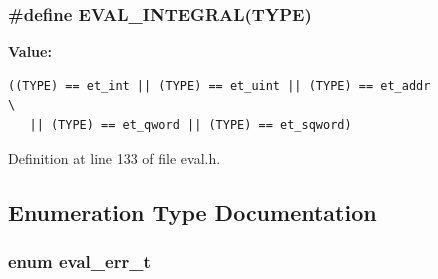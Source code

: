 \subsubsection[{EVAL\_\-INTEGRAL}]{\setlength{\rightskip}{0pt plus 5cm}\#define EVAL\_\-INTEGRAL(TYPE)}\label{eval_8h_967660fa08f8314efb22699958f68a1b}


\textbf{Value:}

\begin{Code}\begin{verbatim}((TYPE) == et_int || (TYPE) == et_uint || (TYPE) == et_addr             \
   || (TYPE) == et_qword || (TYPE) == et_sqword)
\end{verbatim}
\end{Code}


Definition at line 133 of file eval.h.

\subsection{Enumeration Type Documentation}
\subsubsection[{eval\_\-err\_\-t}]{\setlength{\rightskip}{0pt plus 5cm}enum {\bf eval\_\-err\_\-t}}\label{eval_8h_9028fca6bec91c83f48bf214aefec047}



